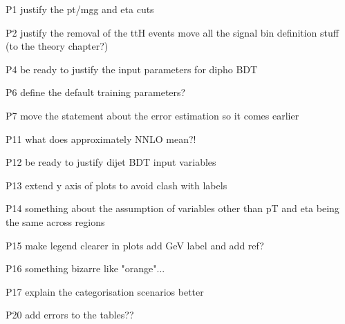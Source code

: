 P1
justify the pt/mgg and eta cuts

P2 
justify the removal of the ttH events
move all the signal bin definition stuff (to the theory chapter?)

P4
be ready to justify the input parameters for dipho BDT

P6
define the default training parameters?

P7
move the statement about the error estimation so it comes earlier

P11
what does approximately NNLO mean?!

P12 
be ready to justify dijet BDT input variables

P13
extend y axis of plots to avoid clash with labels

P14
something about the assumption of variables other than pT and eta being the same across regions

P15
make legend clearer in plots
add GeV label
and add ref?

P16
something bizarre like "orange"...

P17
explain the categorisation scenarios better

P20
add errors to the tables??
